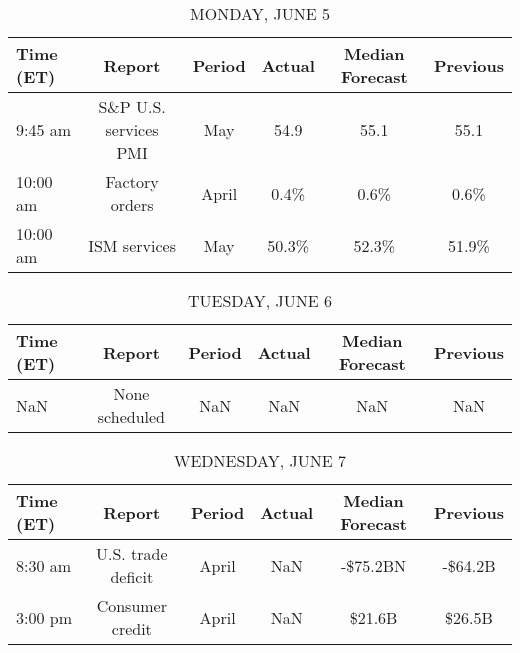 \documentclass{article}%
\begin{document}
%
\normalsize%


\begin{table}[htbp]%
\caption{MONDAY, JUNE 5}%
\centering%
\begin{adjustbox}{width=1\textwidth}%
\begin{tabular}{lccccc}
\toprule
Time (ET) &                Report & Period & Actual & Median Forecast & Previous \\
\midrule
  9:45 am & S\&P U.S. services PMI &    May &   54.9 &            55.1 &     55.1 \\
 10:00 am &        Factory orders &  April &   0.4\% &            0.6\% &     0.6\% \\
 10:00 am &          ISM services &    May &  50.3\% &           52.3\% &    51.9\% \\
\bottomrule
\end{tabular}
%
\end{adjustbox}%
\end{table}

%


\begin{table}[htbp]%
\caption{TUESDAY, JUNE 6}%
\centering%
\begin{adjustbox}{width=1\textwidth}%
\begin{tabular}{lccccc}
\toprule
Time (ET) &         Report & Period & Actual & Median Forecast & Previous \\
\midrule
      NaN & None scheduled &    NaN &    NaN &             NaN &      NaN \\
\bottomrule
\end{tabular}
%
\end{adjustbox}%
\end{table}

%


\begin{table}[htbp]%
\caption{WEDNESDAY, JUNE 7}%
\centering%
\begin{adjustbox}{width=1\textwidth}%
\begin{tabular}{lccccc}
\toprule
Time (ET) &             Report & Period & Actual & Median Forecast & Previous \\
\midrule
  8:30 am & U.S. trade deficit &  April &    NaN &        -\$75.2BN &  -\$64.2B \\
  3:00 pm &    Consumer credit &  April &    NaN &          \$21.6B &   \$26.5B \\
\bottomrule
\end{tabular}
%
\end{adjustbox}%
\end{table}
\end{document}
